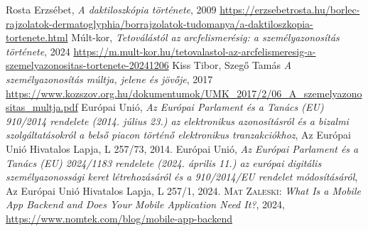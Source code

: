 \documentclass[
]{thesis-ekf}
\theoremstyle{definition}
\theoremstyle{remark}
\begin{document}
\begin{thebibliography}{9}
	 Rosta Erzsébet, \textit{A daktiloszkópia története}, 2009 \url{https://erzsebetrosta.hu/borlec-rajzolatok-dermatoglyphia/borrajzolatok-tudomanya/a-daktiloszkopia-tortenete.html}
	 Múlt-kor, \textit{Tetoválástól az arcfelismerésig: a személyazonosítás története}, 2024 \url{https://m.mult-kor.hu/tetovalastol-az-arcfelismeresig-a-szemelyazonositas-tortenete-20241206}
	 Kiss Tibor, Szegő Tamás \textit{A személyazonosítás múltja, jelene és jövője}, 2017 \url{https://www.kozszov.org.hu/dokumentumok/UMK_2017/2/06_A_szemelyazonositas_multja.pdf}
	 Európai Unió, \textit{Az Európai Parlament és a Tanács (EU) 910/2014 rendelete (2014. július 23.) az elektronikus azonosításról és a bizalmi szolgáltatásokról a belső piacon történő elektronikus tranzakciókhoz}, Az Európai Unió Hivatalos Lapja, L 257/73, 2014.
	 Európai Unió, \textit{Az Európai Parlament és a Tanács (EU) 2024/1183 rendelete (2024. április 11.) az európai digitális személyazonossági keret létrehozásáról és a 910/2014/EU rendelet módosításáról}, Az Európai Unió Hivatalos Lapja, L 257/1, 2024.
	 \textsc{Mat Zaleski:} \textit{What Is a Mobile App Backend and Does Your Mobile Application Need It?}, 2024, \url{https://www.nomtek.com/blog/mobile-app-backend}
\end{thebibliography}
	
\end{document}
